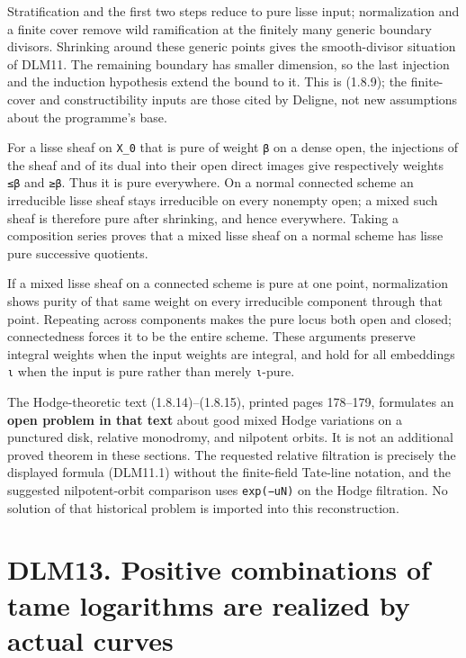 \documentclass[
]{report}
\newcounter{none} %
\begin{document}
Stratification and the first two steps reduce to pure lisse input;
normalization and a finite cover remove wild ramification at the
finitely many generic boundary divisors. Shrinking around these generic
points gives the smooth-divisor situation of DLM11. The remaining
boundary has smaller dimension, so the last injection and the induction
hypothesis extend the bound to it. This is (1.8.9); the finite-cover and
constructibility inputs are those cited by Deligne, not new assumptions
about the programme's base.

For a lisse sheaf on \texttt{X\_0} that is pure of weight \texttt{β} on
a dense open, the injections of the sheaf and of its dual into their
open direct images give respectively weights \texttt{≤β} and
\texttt{≥β}. Thus it is pure everywhere. On a normal connected scheme an
irreducible lisse sheaf stays irreducible on every nonempty open; a
mixed such sheaf is therefore pure after shrinking, and hence
everywhere. Taking a composition series proves that a mixed lisse sheaf
on a normal scheme has lisse pure successive quotients.

If a mixed lisse sheaf on a connected scheme is pure at one point,
normalization shows purity of that same weight on every irreducible
component through that point. Repeating across components makes the pure
locus both open and closed; connectedness forces it to be the entire
scheme. These arguments preserve integral weights when the input weights
are integral, and hold for all embeddings \texttt{ι} when the input is
pure rather than merely \texttt{ι}-pure.

The Hodge-theoretic text (1.8.14)--(1.8.15), printed pages 178--179,
formulates an \textbf{open problem in that text} about good mixed Hodge
variations on a punctured disk, relative monodromy, and nilpotent
orbits. It is not an additional proved theorem in these sections. The
requested relative filtration is precisely the displayed formula
(DLM11.1) without the finite-field Tate-line notation, and the suggested
nilpotent-orbit comparison uses \texttt{exp(−uN)} on the Hodge
filtration. No solution of that historical problem is imported into this
reconstruction.

\section{DLM13. Positive combinations of tame logarithms are realized by
actual
curves}\label{dlm13.-positive-combinations-of-tame-logarithms-are-realized-by-actual-curves}
\end{document}

